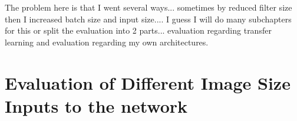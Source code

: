 \begin{table}[h] \centering
{}
\caption{Resnet18 with different number of filters on the FINAL dataset. The number of filters present in paranthesis is the number of filters used per layer.}
\label{tbl:resnet18-sixteen}
\end{table}

The problem here is that I went several ways... sometimes by reduced filter size then I increased batch size and input size.... I guess I will do many subchapters for this or split the evaluation into 2 parts... evaluation regarding transfer learning and evaluation regarding my own architectures.

\section{Evaluation of Different Image Size Inputs to the network}

\begin{table}[h] \centering
{}
\caption{Resnet18 FiveCrop Implementation with and without pre-training. FINAL (regular) means ResNet18 with the resizing of the image instead of cropping and averaging}
\label{tbl:resnet18-448}
\end{table}

